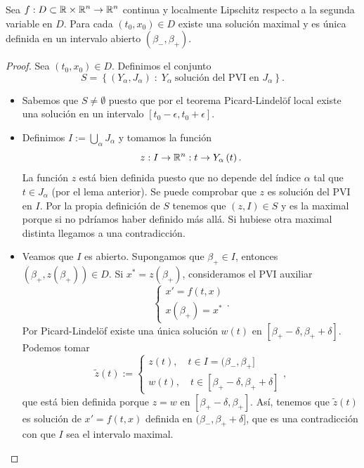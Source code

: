 \begin{theorem}
Sea $\displaystyle f : D \subset \mathbb{R} \times \mathbb{R}^{n}\to \mathbb{R}^{n} $ continua y localmente Lipschitz respecto a la segunda variable en $\displaystyle D $. Para cada $\displaystyle \left(t_{0}, x_{0}\right) \in D$ existe una solución maximal y es única definida en un intervalo abierto $\displaystyle \left(\beta_{-}, \beta_{+}\right) $. 
\end{theorem}
\begin{proof}
	Sea $\displaystyle \left(t_{0}, x_{0}\right)\in D $. Definimos el conjunto
	\[S = \left\{ \left(Y_{\alpha }, J_{\alpha }\right) \; : \; Y_{\alpha }\; \text{solución del PVI en }J_{\alpha }\right\}  .\]
	\begin{itemize}
	\item Sabemos que $\displaystyle S \neq \emptyset $ puesto que por el teorema Picard-Lindelöf local existe una solución en un intervalo $\displaystyle \left[t_{0}-\epsilon , t_{0} + \epsilon \right]  $. 
	\item Definimos $\displaystyle I := \bigcup_{\alpha}J_{\alpha } $ y tomamos la función 
		\[z : I \to \mathbb{R}^{n} : t \to Y_{\alpha }\left(t\right) .\]
	La función $\displaystyle z $ está bien definida puesto que no depende del índice $\displaystyle \alpha  $ tal que $\displaystyle t\in J_{\alpha } $ (por el lema anterior). Se puede comprobar que $\displaystyle z $ es solución del PVI en $\displaystyle I $. Por la propia definición de $\displaystyle S $ tenemos que $\displaystyle \left(z,I\right)\in S $ y es la maximal porque si no pdríamos haber definido más allá. Si hubiese otra maximal distinta llegamos a una contradicción. 
\item Veamos que $\displaystyle I $ es abierto. Supongamos que $\displaystyle \beta_{+}\in I $, entonces $\displaystyle \left(\beta_{+}, z\left(\beta_{+}\right)\right)\in D $. Si $\displaystyle x^{*} = z\left(\beta_{+}\right) $, consideramos el PVI auxiliar
\[
\begin{cases}
x'= f\left(t,x\right) \\
x\left(\beta_{+}\right)=x^{*}
\end{cases}
.\]
Por Picard-Lindelöf existe una única solución $\displaystyle w\left(t\right) $ en $\displaystyle \left[\beta_{+}-\delta, \beta_{+} + \delta \right]  $. Podemos tomar
\[\tilde{z}\left(t\right):=
\begin{cases}
	z\left(t\right),\quad t \in I=(\beta_{-}, \beta_{+}] \\
	w\left(t\right), \quad t \in [\beta_{+ }-\delta, \beta_{+} + \delta]
\end{cases}
,\]
que está bien definida porque $\displaystyle z = w $ en $\displaystyle \left[\beta_{+ }-\delta, \beta_{+}\right]  $. Así, tenemos que $\displaystyle \tilde{z}\left(t\right) $ es solución de $\displaystyle x'=f\left(t,x\right) $ definida en $\displaystyle (\beta_{-}, \beta_{+ }+ \delta] $, que es una contradicción con que $\displaystyle I $ sea el intervalo maximal. 
	\end{itemize}
\end{proof}
